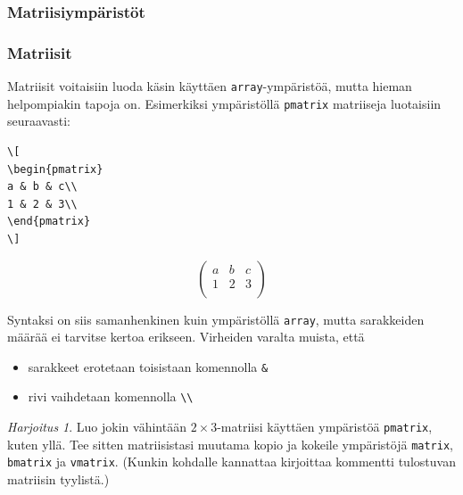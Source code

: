 \documentclass[handout]{beamer}
\theoremstyle{remark}
\newtheorem{harj}{Harjoitus}[section]
\begin{document}
\subsubsection{Matriisiympäristöt}
\begin{frame}[fragile]
\frametitle{Matriisit}
Matriisit voitaisiin luoda käsin käyttäen \verb-array--ympäristöä, mutta hieman helpompiakin tapoja on. Esimerkiksi ympäristöllä \verb-pmatrix- matriiseja luotaisiin seuraavasti:

\begin{minipage}{4cm}
\begin{scriptsize}
\begin{Verbatim}[frame=single]
\[
\begin{pmatrix}
a & b & c\\
1 & 2 & 3\\
\end{pmatrix}
\]
\end{Verbatim}
\end{scriptsize}
\end{minipage}
\begin{minipage}{4cm}
\[
\begin{pmatrix}
a & b & c\\
1 & 2 & 3\\
\end{pmatrix}
\]
\end{minipage}

Syntaksi on siis samanhenkinen kuin ympäristöllä \verb-array-, mutta sarakkeiden määrää ei tarvitse kertoa erikseen. Virheiden varalta muista, että
\begin{itemize}
\item sarakkeet erotetaan toisistaan komennolla \verb-&-
\item rivi vaihdetaan komennolla \verb-\\-
\end{itemize}

%
\end{frame}
\begin{frame}[fragile]
\begin{harj}
Luo jokin vähintään \(2\times 3\)-matriisi käyttäen ympäristöä \verb-pmatrix-, kuten yllä. Tee sitten matriisistasi muutama kopio ja kokeile ympäristöjä \verb-matrix-, \verb-bmatrix- ja \verb-vmatrix-. (Kunkin kohdalle kannattaa kirjoittaa kommentti tulostuvan matriisin tyylistä.)
\end{harj}
\end{frame}
\end{document}
